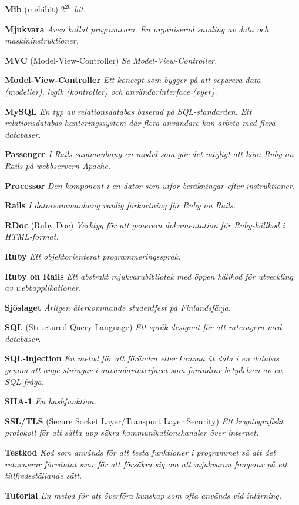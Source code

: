 \documentclass[a4paper, twoside, 11pt, titlepage]{article}
\begin{document}
	\textbf{Mib} (mebibit) \emph{$2^{20}$ bit.}

	\textbf{Mjukvara} \emph{Även kallat programvara. En organiserad samling av data och maskininstruktioner.}

	\textbf{MVC} (Model-View-Controller) \emph{Se Model-View-Controller.}

	\textbf{Model-View-Controller} \emph{Ett koncept som bygger på att separera data (modeller), logik (kontroller) och användarinterface (vyer).}

	\textbf{MySQL} \emph{En typ av relationsdatabas baserad på SQL-standarden. Ett relationsdatabas hanteringssystem där flera användare kan arbeta med flera databaser.}

	\textbf{Passenger} \emph{I Rails-sammanhang en modul som gör det möjligt att köra Ruby on Rails på webbservern Apache.}

	\textbf{Processor} \emph{Den komponent i en dator som utför beräkningar efter instruktioner.}

	\textbf{Rails} \emph{I datorsammanhang vanlig förkortning för Ruby on Rails.}

	\textbf{RDoc} (Ruby Doc) \emph{Verktyg för att generera dokumentation för Ruby-källkod i HTML-format.}

	\textbf{Ruby} \emph{Ett objektorienterat programmeringsspråk.}

	\textbf{Ruby on Rails} \emph{Ett abstrakt mjukvarubibliotek med öppen källkod för utveckling av webbapplikationer.}

	\textbf{Sjöslaget} \emph{Årligen återkommande studentfest på Finlandsfärja.}

	\textbf{SQL} (Structured Query Language) \emph{Ett språk designat för att interagera med databaser.}

	\textbf{SQL-injection} \emph{En metod för att förändra eller komma åt data i en databas genom att ange strängar i användarinterfacet som förändrar betydelsen av en SQL-fråga.}

	\textbf{SHA-1} \emph{En hashfunktion.}

	\textbf{SSL/TLS} (Secure Socket Layer/Transport Layer Security) \emph{Ett kryptografiskt protokoll för att sätta upp säkra kommunikationskanaler över internet.}

	\textbf{Testkod} \emph{Kod som används för att testa funktioner i programmet så att det returnerar förväntat svar för att försäkra sig om att mjukvaran fungerar på ett tillfredsställande sätt.}

	\textbf{Tutorial} \emph{En metod för att överföra kunskap som ofta används vid inlärning.}
\end{document}
